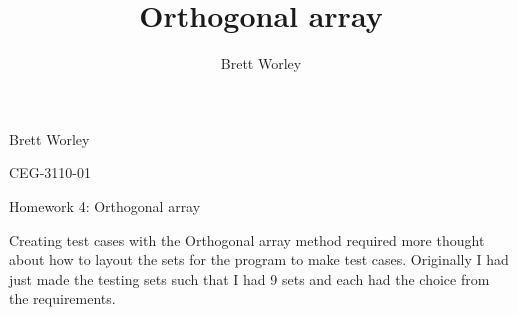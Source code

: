\documentclass[12pt,letterpaper]{article}
\author{Brett Worley}
\title{Orthogonal array}
\begin{document}
Brett Worley

CEG-3110-01

\centerline{ Homework 4: Orthogonal array}

Creating test cases with the Orthogonal array method required more thought about
how to layout the sets for the program to make test cases. Originally I had just
made the testing sets such that I had 9 sets and each had the choice from the
requirements.

%
%
%
\end{document}
